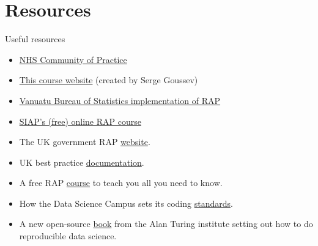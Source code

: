 \documentclass[xcolor=x11names,compress]{beamer}
\renewcommand{\(}{\begin{columns}}
\renewcommand{\)}{\end{columns}}
\newcommand{\<}[1]{\begin{column}{#1}}
\renewcommand{\>}{\end{column}}
\begin{document}
\section{Resources}
\begin{frame}{Useful resources}
  \begin{itemize}
  \item  \href{https://nhsdigital.github.io/rap-community-of-practice/introduction_to_RAP/what_is_RAP/}{NHS Community of Practice}
   \item  \href{https://github.com/sergegoussev/ESCAP_RAP_class/tree/main}{This course website} (created by Serge Goussev)
   \item \href{https://github.com/Vanuatu-National-Statistics-Office/vnso-RAP-marketStats-materials}{Vanuatu Bureau of Statistics implementation of RAP}
   \item \href{https://www.unsiap.or.jp/on_line/2024/RAP/flyer-RAP-Self-paced.pdf}{SIAP's (free) online RAP course}
    \item The UK government RAP \href{https://ukgovdatascience.github.io/rap-website/index.html}{website}.
    \item UK best practice \href{https://gss.civilservice.gov.uk/policy-store/quality-statistics-in-government/\#reproducible-analytical-pipelines-rap-}{documentation}.
    \item A free RAP \href{https://www.udemy.com/course/reproducible-analytical-pipelines/}{course} to teach you all you need to know.
    \item How the Data Science Campus sets its coding \href{https://datasciencecampus.github.io/coding-standards/}{standards}.
    \item A new open-source \href{https://the-turing-way.netlify.com}{book} from the Alan Turing institute setting out how to do reproducible data science.
  \end{itemize}
\end{frame}
\end{document}
